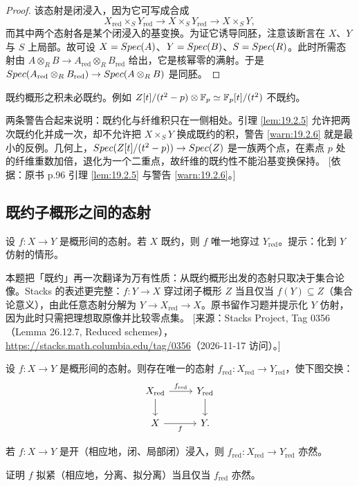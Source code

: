 \begin{proof}
该态射是闭浸入，因为它可写成合成
\[
X_{\mathrm{red}}\times_S Y_{\mathrm{red}}\to X\times_S Y_{\mathrm{red}}\to X\times_S Y,
\]
而其中两个态射各是某个闭浸入的基变换。为证它诱导同胚，注意该断言在 $X$、$Y$ 与 $S$ 上局部。故可设 $X=Spec(A)$、$Y=Spec(B)$、$S=Spec(R)$。此时所需态射由 $A\otimes_R B\to A_{\mathrm{red}}\otimes_R B_{\mathrm{red}}$ 给出，它是核幂零的满射。于是 $Spec(A_{\mathrm{red}}\otimes_R B_{\mathrm{red}})\to Spec(A\otimes_R B)$ 是同胚。
\end{proof}

\begin{warning}\label{warn:19.2.6}
既约概形之积未必既约。例如 $Z[t]/(t^2-p)\otimes\mathbb{F}_p\simeq\mathbb{F}_p[t]/(t^2)$ 不既约。
\end{warning}

\begin{yizhu}
两条警告合起来说明：既约化与纤维积只在一侧相处。引理 \ref{lem:19.2.5} 允许把两次既约化并成一次，却不允许把 $X\times_S Y$ 换成既约的积，警告 \ref{warn:19.2.6} 就是最小的反例。几何上，$Spec(Z[t]/(t^2-p))\to Spec(Z)$ 是一族两个点，在素点 $p$ 处的纤维重数加倍，退化为一个二重点，故纤维的既约性不能沿基变换保持。
[依据：原书 p.96 引理 \ref{lem:19.2.5} 与警告 \ref{warn:19.2.6}。]
\end{yizhu}

\subsection{既约子概形之间的态射}\label{sec:19.3}

\begin{exercise}\label{exc:19.3.1}
设 $f:X\to Y$ 是概形间的态射。若 $X$ 既约，则 $f$ 唯一地穿过 $Y_{\mathrm{red}}$。提示：化到 $Y$ 仿射的情形。
\end{exercise}

\begin{yizhu}
本题把「既约」再一次翻译为万有性质：从既约概形出发的态射只取决于集合论像。Stacks 的表述更完整：$f:Y\to X$ 穿过闭子概形 $Z$ 当且仅当 $f(Y)\subseteq Z$（集合论意义），由此任意态射分解为 $Y\to X_{\mathrm{red}}\to X$。原书留作习题并提示化 $Y$ 仿射，因为此时只需把理想取原像并比较零点集。
[来源：Stacks Project, Tag 0356（Lemma 26.12.7, Reduced schemes），\url{https://stacks.math.columbia.edu/tag/0356}（2026-11-17 访问）。]
\end{yizhu}

\begin{corollary}\label{cor:19.3.2}
设 $f:X\to Y$ 是概形间的态射。则存在唯一的态射 $f_{\mathrm{red}}:X_{\mathrm{red}}\to Y_{\mathrm{red}}$，使下图交换：
\[
\begin{tikzcd}
X_{\mathrm{red}} \arrow[r,"f_{\mathrm{red}}"] \arrow[d] & Y_{\mathrm{red}} \arrow[d] \\
X \arrow[r,"f"'] & Y.
\end{tikzcd}
\]
\end{corollary}

\begin{exercise}\label{exc:19.3.3}
若 $f:X\to Y$ 是开（相应地，闭、局部闭）浸入，则 $f_{\mathrm{red}}:X_{\mathrm{red}}\to Y_{\mathrm{red}}$ 亦然。
\end{exercise}

\begin{exercise}\label{exc:19.3.4}
证明 $f$ 拟紧（相应地，分离、拟分离）当且仅当 $f_{\mathrm{red}}$ 亦然。
\end{exercise}

